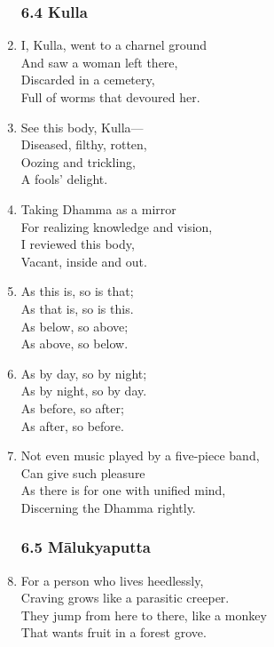 \documentclass[10pt, openany]{book}
\begin{document}
\begin{enumerate}
\subsubsection*{6.4 Kulla}

\item I, Kulla, went to a charnel ground\\
And saw a woman left there,\\
Discarded in a cemetery,\\
Full of worms that devoured her.

\item See this body, Kulla—\\
Diseased, filthy, rotten,\\
Oozing and trickling,\\
A fools’ delight.

\item Taking Dhamma as a mirror\\
For realizing knowledge and vision,\\
I reviewed this body,\\
Vacant, inside and out.

\item As this is, so is that;\\
As that is, so is this.\\
As below, so above;\\
As above, so below.

\item As by day, so by night;\\
As by night, so by day.\\
As before, so after;\\
As after, so before.

\item Not even music played by a five-piece band,\\
Can give such pleasure\\
As there is for one with unified mind,\\
Discerning the Dhamma rightly.

\subsubsection*{6.5 Mālukyaputta}

\item For a person who lives heedlessly,\\
Craving grows like a parasitic creeper.\\
They jump from here to there, like a monkey\\
That wants fruit in a forest grove.


\end{enumerate}
\end{document}
